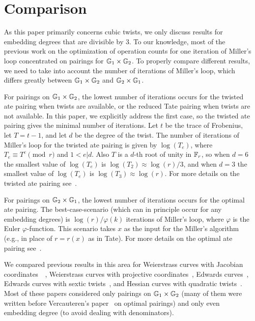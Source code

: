 \section{Comparison}
\label{sec:cmp}

As this paper primarily concerns cubic twists, 
we only discuss results for embedding degrees that are divisible by 3.
To our knowledge, most of the previous work
on the optimization of operation counts for one iteration of Miller's loop
concentrated on pairings for $\mathbb{G}_{1} \times \mathbb{G}_{2}$. 
To properly compare different results, we need to take
into account the number of iterations of Miller's loop, which differs
greatly between $\mathbb{G}_{1} \times \mathbb{G}_{2}$ and $\mathbb{G}_{2} \times \mathbb{G}_{1}$.

For pairings on $\mathbb{G}_{1} \times \mathbb{G}_{2}$, the lowest number of iterations occurs for the twisted ate pairing when twists are available, or the reduced Tate pairing when twists are not available.
In this paper, we explicitly address the first case, so the twisted ate pairing gives the minimal number of iterations. 
Let $t$ be the trace of Frobenius, let $T = t-1$, and let $d$ be the degree of the twist. The number of iterations of Miller's loop for the twisted ate pairing is given by $\log(T_e)$, where
$T_e \equiv T^e \pmod{r}$ and $1 < e | d$. 
Also $T$ is a $d$-th root of unity in $\mathbb{F}_{r}$, so when $d = 6$ the smallest value of
$\log(T_e)$ is $\log(T_2) \approx \log(r)/3$, and when $d = 3$ the smallest value of $\log(T_e)$ is
$\log(T_3) \approx \log(r)$. For more details on the twisted ate pairing see~\cite{2006/hess}.

For pairings on $\mathbb{G}_{2} \times \mathbb{G}_{1}$, the lowest number of iterations occurs for the optimal ate pairing. The best-case-scenario (which can in principle occur for any embedding degrees) is $\log(r)/\varphi(k)$ iterations of Miller's loop, where $\varphi$ is the Euler $\varphi$-function. This scenario takes $x$ as the input for the Miller's algorithm (e.g., in place of $r = r(x)$ as in Tate). For more details on the optimal ate pairing see~\cite{2010/vercauteren}. 

We compared previous results in this area for 
Weierstrass curves with Jacobian coordinates~\cite{2008/IonicaJoux08}~\cite{2009/fastertate},
Weierstrass curves with projective coordinates~\cite{2009/craig},
Edwards curves~\cite{2009/fastertate},
Edwards curves with sextic twists~\cite{2014/LWZ},
and Hessian curves with quadratic twists~\cite{2010/Gu}.
Most of these papers considered only pairings on $\mathbb{G}_{1} \times \mathbb{G}_{2}$ 
(many of them were written before Vercauteren's paper~\cite{2010/vercauteren} on optimal pairings)
and only even embedding degree (to avoid dealing with denominators).

